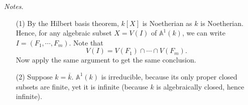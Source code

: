 \documentclass{article}
\begin{document}
\emph{Notes.}
\begin{enumerate}
\item[(1)]
  By the Hilbert basis theorem, $k[X]$ is Noetherian as $k$ is Noetherian.
  Hence, for any algebraic subset $X = V(I)$ of $\mathbb{A}^1(k)$,
  we can write $I = (F_1, \cdots, F_m)$.
  Note that
  \[
    V(I) = V(F_1) \cap \cdots \cap V(F_m).
  \]
  Now apply the same argument to get the same conclusion.

\item[(2)]
  Suppose $k = \overline{k}$.
  $\mathbb{A}^1(k)$ is irreducible, because its only proper closed subsets are finite,
  yet it is infinite
  (because $k$ is algebraically closed, hence infinite).

\end{enumerate}



\end{document}
